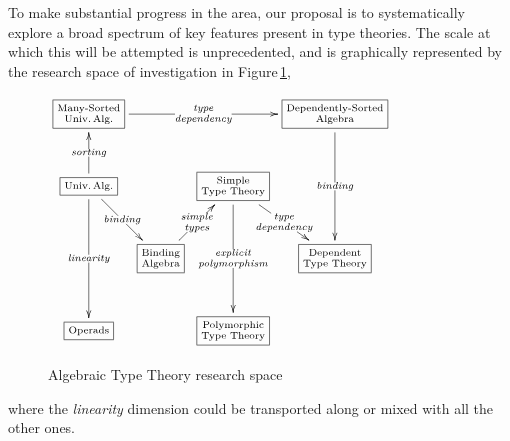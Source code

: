 \documentclass[11pt,twocolumn]{article}
\begin{document}
To make substantial progress in the area, our proposal is to
systematically explore a broad spectrum of key features present in type
theories. The scale at which this will be attempted is unprecedented,
and is graphically represented by the research space of investigation in
Figure\,\ref{TypeTheoryResearchSpace}, 
\begin{figure}[h]
\caption{Algebraic Type Theory research space}
\vspace*{1mm}
\begin{center}
$\xymatrix@C=2.5pt@R=25pt{
*+[]{\fbox{\scriptsize\txt{Many-Sorted\\ Univ.\,Alg.
}}}
\ar[rrr]|-{\mbox{\scriptsize\txt{\emph{type}\\\emph{dependency}}}}
& 
& 
& 
*+[]{\fbox{\scriptsize\txt{Dependently-Sorted\\ Algebra}}}
\ar[dd]|-{\mbox{\scriptsize\emph{binding}}}
\\
*+[]{\fbox{\scriptsize\txt{Univ.\,Alg.%
}}}
\ar[u]|-{\mbox{\scriptsize\emph{sorting}}}
\ar[rd]|-{\mbox{\scriptsize\emph{binding}}} 
\ar[dd]|-{\mbox{\scriptsize\emph{linearity}}}
& &
*+[]{\fbox{\scriptsize\txt{Simple\\Type Theory}}}
\ar[rd]|-{\mbox{\scriptsize\txt{\emph{type}\\\emph{dependency}}}}
\ar[dd]|-{\mbox{\scriptsize\txt{\emph{explicit}\\\emph{polymorphism}}}}
& 
\\ 
& 
*+[]{\fbox{\scriptsize\txt{Binding\\Algebra}}}
\ar[ur]|-{\mbox{\scriptsize\txt{\emph{simple}\\\emph{types}}}}
&
&
*+[]{\fbox{\scriptsize\txt{Dependent\\Type Theory}}}
\\
*+[]{\fbox{\scriptsize\shortstack{Operads}}}
& & 
*+[]{\fbox{\scriptsize\txt{Polymorphic\\Type Theory}}}
& 
}$
\end{center}
\vspace*{-3mm}
\label{TypeTheoryResearchSpace}
\end{figure}
where the \emph{linearity} dimension could be transported along or mixed
with all the other ones.
\end{document}
